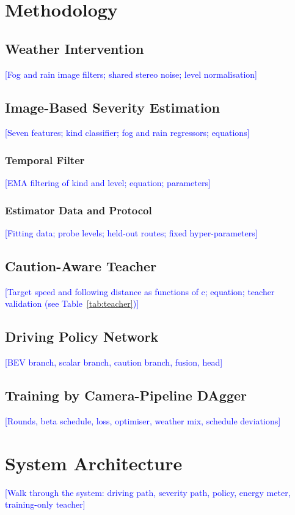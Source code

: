 \documentclass[conference]{IEEEtran}
\newcommand{\placeholder}[1]{\textcolor{blue}{[#1]}}
\begin{document}
\section{Methodology}\label{sec:method}
\subsection{Weather Intervention}
\placeholder{Fog and rain image filters; shared stereo noise; level normalisation}
\subsection{Image-Based Severity Estimation}
\placeholder{Seven features; kind classifier; fog and rain regressors; equations}
\subsubsection{Temporal Filter}
\placeholder{EMA filtering of kind and level; equation; parameters}
\subsubsection{Estimator Data and Protocol}
\placeholder{Fitting data; probe levels; held-out routes; fixed hyper-parameters}
\subsection{Caution-Aware Teacher}
\placeholder{Target speed and following distance as functions of c; equation; teacher validation (see Table~\ref{tab:teacher})}
\subsection{Driving Policy Network}
\placeholder{BEV branch, scalar branch, caution branch, fusion, head}
\subsection{Training by Camera-Pipeline DAgger}
\placeholder{Rounds, beta schedule, loss, optimiser, weather mix, schedule deviations}

\section{System Architecture}\label{sec:arch}
\placeholder{Walk through the system: driving path, severity path, policy, energy meter, training-only teacher}
\end{document}
